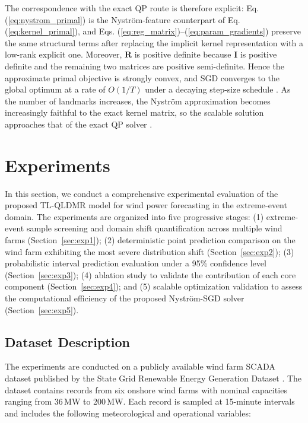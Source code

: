 \documentclass[a4paper]{cas-sc}
\begin{document}
The correspondence with the exact QP route is therefore explicit: Eq. (\ref{eq:nystrom_primal}) is the Nystr\"{o}m-feature counterpart of Eq. (\ref{eq:kernel_primal}), and Eqs. (\ref{eq:reg_matrix})--(\ref{eq:param_gradients}) preserve the same structural terms after replacing the implicit kernel representation with a low-rank explicit one. Moreover, $\boldsymbol{R}$ is positive definite because $\boldsymbol{I}$ is positive definite and the remaining two matrices are positive semi-definite. Hence the approximate primal objective is strongly convex, and SGD converges to the global optimum at a rate of $O(1/T)$ under a decaying step-size schedule \citep{bottou2018optimization}. As the number of landmarks increases, the Nystr\"{o}m approximation becomes increasingly faithful to the exact kernel matrix, so the scalable solution approaches that of the exact QP solver \citep{kumar2012sampling, zhang2010clustered}.


\section{Experiments}\label{Experiments}

In this section, we conduct a comprehensive experimental evaluation of the proposed TL-QLDMR model for wind power forecasting in the extreme-event domain. The experiments are organized into five progressive stages: (1) extreme-event sample screening and domain shift quantification across multiple wind farms (Section~\ref{sec:exp1}); (2) deterministic point prediction comparison on the wind farm exhibiting the most severe distribution shift (Section~\ref{sec:exp2}); (3) probabilistic interval prediction evaluation under a 95\% confidence level (Section~\ref{sec:exp3}); (4) ablation study to validate the contribution of each core component (Section~\ref{sec:exp4}); and (5) scalable optimization validation to assess the computational efficiency of the proposed Nystr\"{o}m-SGD solver (Section~\ref{sec:exp5}).

\subsection{Dataset Description}\label{sec:data}

The experiments are conducted on a publicly available wind farm SCADA dataset published by the State Grid Renewable Energy Generation Dataset \citep{s41597-022-01696-6}. The dataset contains records from six onshore wind farms with nominal capacities ranging from 36\,MW to 200\,MW. Each record is sampled at 15-minute intervals and includes the following meteorological and operational variables:
\end{document}
